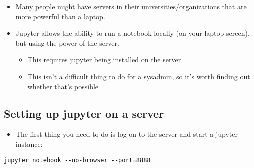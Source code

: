\documentclass[10pt,parskip=half,
	toc=sectionentrywithdots,
	bibliography=totocnumbered,
	captions=tableheading,numbers=noendperiod]{scrartcl}
\providecommand{\tightlist}{%
  \setlength{\itemsep}{0pt}\setlength{\parskip}{0pt}}
\begin{document}
\begin{itemize}
\tightlist
\item
  Many people might have servers in their universities/organizations
  that are more powerful than a laptop.
\item
  Jupyter allows the ability to run a notebook locally (on your laptop
  screen), but using the power of the server.

  \begin{itemize}
  \tightlist
  \item
    This requires jupyter being installed on the server
  \item
    This isn't a difficult thing to do for a sysadmin, so it's worth
    finding out whether that's possible
  \end{itemize}
\end{itemize}

\hypertarget{setting-up-jupyter-on-a-server}{%
\subsection{Setting up jupyter on a
server}\label{setting-up-jupyter-on-a-server}}

\begin{itemize}
\tightlist
\item
  The first thing you need to do is log on to the server and start a
  jupyter instance:
\end{itemize}

\texttt{jupyter\ notebook\ -\/-no-browser\ -\/-port=8888}
\end{document}
